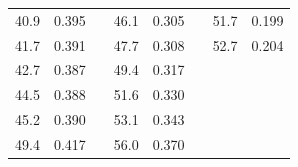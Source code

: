 \documentclass[a4paper,12pt]{article} %
\begin{document}
\begin{table}[h!]
\begin{tabular}{cclcclcc}
				\multicolumn{1}{|c|}{40.9}               & \multicolumn{1}{c|}{0.395} & \multicolumn{1}{l|}{} & \multicolumn{1}{c|}{46.1}       & \multicolumn{1}{c|}{0.305} & \multicolumn{1}{l|}{} & \multicolumn{1}{c|}{51.7}       & \multicolumn{1}{c|}{0.199} \\ \cline{1-2} \cline{4-5} \cline{7-8} 
				\multicolumn{1}{|c|}{41.7}               & \multicolumn{1}{c|}{0.391} & \multicolumn{1}{l|}{} & \multicolumn{1}{c|}{47.7}       & \multicolumn{1}{c|}{0.308} & \multicolumn{1}{l|}{} & \multicolumn{1}{c|}{52.7}       & \multicolumn{1}{c|}{0.204} \\ \cline{1-2} \cline{4-5} \cline{7-8} 
				\multicolumn{1}{|c|}{42.7}               & \multicolumn{1}{c|}{0.387} & \multicolumn{1}{l|}{} & \multicolumn{1}{c|}{49.4}       & \multicolumn{1}{c|}{0.317} &                       & \multicolumn{1}{l}{}            & \multicolumn{1}{l}{}       \\ \cline{1-2} \cline{4-5}
				\multicolumn{1}{|c|}{44.5}               & \multicolumn{1}{c|}{0.388} & \multicolumn{1}{l|}{} & \multicolumn{1}{c|}{51.6}       & \multicolumn{1}{c|}{0.330} &                       & \multicolumn{1}{l}{}            & \multicolumn{1}{l}{}       \\ \cline{1-2} \cline{4-5}
				\multicolumn{1}{|c|}{45.2}               & \multicolumn{1}{c|}{0.390} & \multicolumn{1}{l|}{} & \multicolumn{1}{c|}{53.1}       & \multicolumn{1}{c|}{0.343} &                       & \multicolumn{1}{l}{}            & \multicolumn{1}{l}{}       \\ \cline{1-2} \cline{4-5}
				\multicolumn{1}{|c|}{49.4}               & \multicolumn{1}{c|}{0.417} & \multicolumn{1}{l|}{} & \multicolumn{1}{c|}{56.0}       & \multicolumn{1}{c|}{0.370} &                       & \multicolumn{1}{l}{}            & \multicolumn{1}{l}{}       \\ \cline{1-2} \cline{4-5}
				\end{tabular}
			\end{table}\par
			


			
\end{document}
